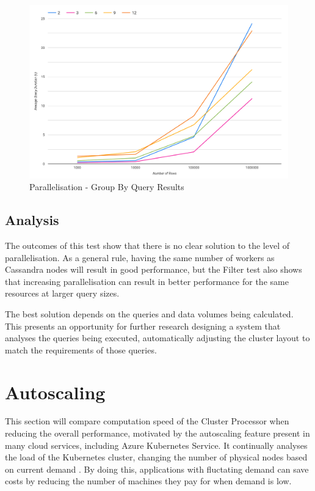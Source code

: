 \begin{figure}[ht]
	\centering
	\includegraphics[width=0.8\linewidth]{chapters/diagrams/testing/group-by-simple-parallelisation-test}
	\caption{Parallelisation - Group By Query Results}
	\label{fig:group-by-simple-parallelisation-test}
\end{figure}

\subsection{Analysis}
The outcomes of this test show that there is no clear solution to the level of parallelisation. As a general rule, having the same number of workers as Cassandra nodes will result in good performance, but the Filter test also shows that increasing parallelisation can result in better performance for the same resources at larger query sizes. 

The best solution depends on the queries and data volumes being calculated. This presents an opportunity for further research designing a system that analyses the queries being executed, automatically adjusting the cluster layout to match the requirements of those queries.

\pagebreak
\section{Autoscaling}
This section will compare computation speed of the Cluster Processor when reducing the overall performance, motivated by the autoscaling feature present in many cloud services, including Azure Kubernetes Service. It continually analyses the load of the Kubernetes cluster, changing the number of physical nodes based on current demand \cite{aksautoscaling}. By doing this, applications with fluctating demand can save costs by reducing the number of machines they pay for when demand is low.

